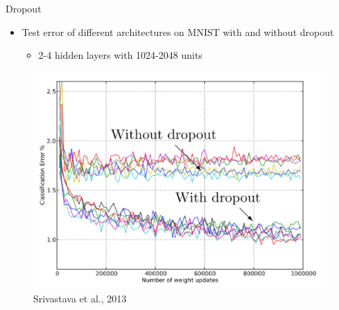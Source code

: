\documentclass[serif, aspectratio=169]{beamer}
\begin{document}
\begin{frame}{Dropout}
	\begin{itemize}
		\item Test error of different architectures on MNIST with and without dropout
		\begin{itemize}
			\item 2-4 hidden layers with 1024-2048 units
		\end{itemize}
	\end{itemize}
	\begin{figure}[htpb]
		\begin{center}
			\includegraphics[keepaspectratio, scale=0.22]{pic/dropout4}
			\caption*{\scriptsize Srivastava et al., 2013}
		\end{center}
	\end{figure}
\end{frame}
\end{document}
